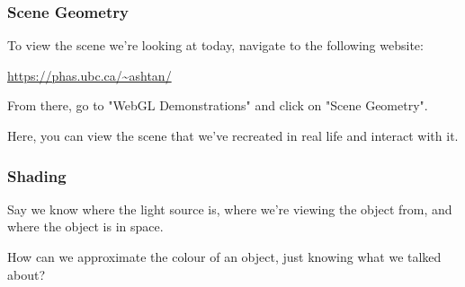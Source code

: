 \documentclass[12pt]{beamer}
\begin{document}
  \begin{frame}
    \frametitle{Scene Geometry}



    To view the scene we're looking at today, navigate to the following website:

    \url{https://phas.ubc.ca/~ashtan/}

    \hfill

    From there, go to "WebGL Demonstrations" and click on "Scene Geometry".

    Here, you can view the scene that we've recreated in real life and interact with it.

  \end{frame}


  \begin{frame}
    \frametitle{Shading}

    Say we know where the light source is, where we're viewing the object from, and where the object is in space.

    \hfill


    How can we approximate the colour of an object, just knowing what we talked about?

  \end{frame}
\end{document}

